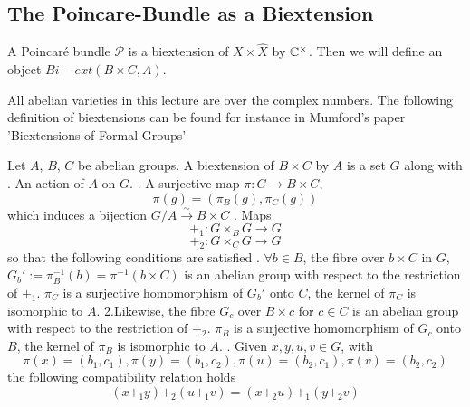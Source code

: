 \subsection{The Poincare-Bundle as a Biextension} \label{section:biextension}
A Poincar\'{e} bundle $\mathcal{P}$ is a biextension of $X\times \hat{X}$ by ${\mathbb C}^\times$. Then we will define an object $Bi-ext(B\times C,A)$. 



\begin{paragraph}
{}All abelian varieties in this lecture are over the complex numbers. The following definition of biextensions can be found for instance in Mumford's paper 'Biextensions of Formal Groups' \begin{definition} Let $A$, $B$, $C$ be abelian groups. A biextension of $B\times C$ by $A$ is a set $G$ along with 
. An action of $A$ on $G$.
. A surjective map $ \pi: G\rightarrow B\times C$, \begin{equation*} \pi(g)=(\pi_B(g), \pi_C(g)) \end{equation*} which induces a bijection $G/A\xrightarrow{\sim} B\times C$
. Maps \begin{equation*}
+_1: G\times_B G\rightarrow G
\end{equation*}
\begin{equation*}
+_2: G\times_C G\rightarrow G
\end{equation*}
so that the following conditions are satisfied
. $\forall b\in B$, the fibre over $b\times C$ in $G$, $G_b':=\pi_B^{-1}(b)=\pi^{-1}(b\times C)$ is an abelian group with respect to the restriction of $+_1$. $\pi_C$ is a surjective homomorphism of $G_b'$ onto $C$, the kernel of $\pi_C$ is isomorphic to $A$. 
\newline 
2.Likewise, the fibre $G_c$ over $B\times c$ for $c\in C$ is an abelian group with respect to the restriction of $+_2$. $\pi_B$ is a surjective homomorphism of $G_c$ onto $B$, the kernel of $\pi_B$ is isomorphic to $A$.
. Given $x,y,u,v\in G$, with
\begin{equation*}
\pi(x)=(b_1,c_1), \pi(y)=(b_1,c_2), \pi(u)=(b_2,c_1), \pi(v)=(b_2,c_2)
\end{equation*}
the following compatibility relation holds
\begin{equation*}
(x +_1 y)+_2 (u +_1 v)=(x +_2 u) +_1 (y+_2 v)

\end{equation*}
\end{definition}
\end{paragraph}
